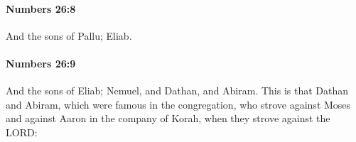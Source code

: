 		\paragraph{Numbers 26:8} %
			\label{NUMBERS-26-8}

			And the sons of Pallu; Eliab.


		\paragraph{Numbers 26:9} %
			\label{NUMBERS-26-9}

			And the sons of Eliab; Nemuel, and Dathan, and Abiram. This is that Dathan and Abiram, which were famous in the congregation, who strove against Moses and against Aaron in the company of Korah, when they strove against the LORD:


